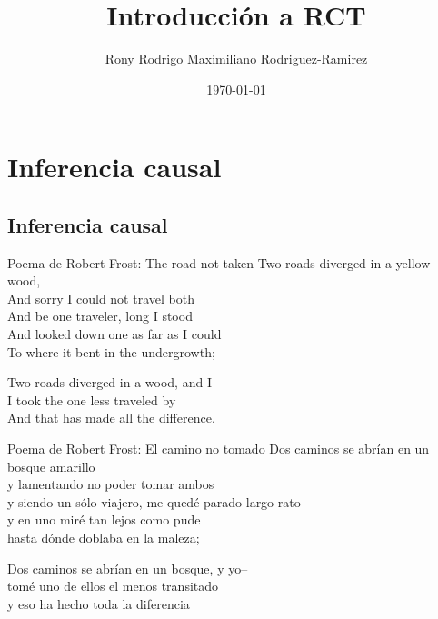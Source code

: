 \documentclass[11pt, aspectratio=169, compress]{beamer}
\title{Introducción a RCT}
\author{Rony Rodrigo Maximiliano Rodriguez-Ramirez}
\institute{maximiliano.rod.ra@gmail.com \\ DECRG | The World Bank}
\date{\today}
\begin{document}
	
\begin{frame}[plain]
	\maketitle  
\end{frame}


\section{Inferencia causal}
\subsection{Inferencia causal}
\begin{frame}{Poema de Robert Frost: The road not taken}
Two roads diverged in a yellow wood, \\
And sorry I could not travel both\\
And be one traveler, long I stood\\
And looked down one as far as I could\\
To where it bent in the undergrowth; 


Two roads diverged in a wood, and I--\\
I took the one less traveled by \\
And that has made all the difference. 

\end{frame}
\begin{frame}{Poema de Robert Frost: El camino no tomado}
Dos caminos se abrían en un bosque amarillo	\\
y lamentando no poder tomar ambos		\\
y siendo un sólo viajero, me quedé parado largo rato	\\
y en uno miré tan lejos como pude	\\
hasta dónde doblaba en la maleza;


Dos caminos se abrían en un bosque, y yo-- \\ 
tomé uno de ellos el menos transitado \\ 
y eso ha hecho toda la diferencia	
	
\end{frame}
\end{document}
